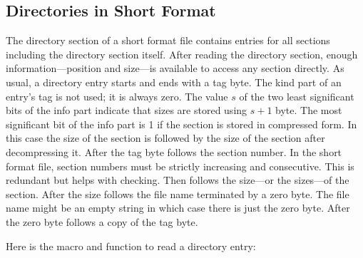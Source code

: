 
\subsection{Directories in Short Format}
The directory section of a short format file contains entries
for all sections including the directory section itself. After reading the
directory section, enough information---position and size---is available to
access any section directly. As usual, a directory entry starts and ends with
a tag byte. The kind part of an entry's tag is not used; it is always zero.
The value $s$ of the two least significant bits of the info part indicate
that sizes are stored using $s+1$ byte.  The most significant bit of the info
part is 1 if the section is stored in compressed form. In this case the size
of the section is followed by the size of the section after decompressing it.
After the tag byte follows the section number. In the short format file,
section numbers must be strictly increasing and consecutive. This is redundant but helps
with checking. Then follows the size---or the sizes---of the section. After the size
follows the file name terminated by a zero byte. The file name might be an empty
string in which case there is just the zero byte. After the zero byte follows
a copy of the tag byte.

Here is the macro and function to read a directory entry:
\gdef\subcodetitle{Directory Entries}%
\getcode

